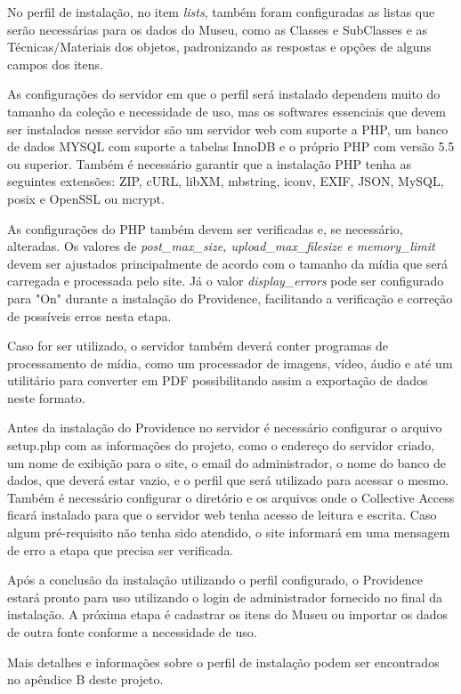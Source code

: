 \documentclass[a4paper,12pt,oneside,onecolumn,final,fleqn]{repUERJ}
\begin{document}
No perfil de instalação, no item \textit{lists}, também foram configuradas as listas que serão necessárias para os dados do Museu, como as Classes e SubClasses e as Técnicas/Materiais dos objetos, padronizando as respostas e opções de alguns campos dos itens.

As configurações do servidor em que o perfil será instalado dependem muito do tamanho da coleção e necessidade de uso, mas os softwares essenciais que devem ser instalados nesse servidor são um servidor web com suporte a PHP, um banco de dados MYSQL com suporte a tabelas InnoDB e o próprio PHP com versão 5.5 ou superior. Também é necessário garantir que a instalação PHP tenha as seguintes extensões: ZIP, cURL, libXM, mbstring, iconv, EXIF, JSON, MySQL, posix e OpenSSL ou mcrypt.

As configurações do PHP também devem ser verificadas e, se necessário, alteradas. Os valores de \textit{post\_max\_size, upload\_max\_filesize e memory\_limit} devem ser ajustados principalmente de acordo com o tamanho da mídia que será carregada e processada pelo site. Já o valor \textit{display\_errors} pode ser configurado para "On" durante a instalação do Providence, facilitando a verificação e correção de possíveis erros nesta etapa.

Caso for ser utilizado, o servidor também deverá conter programas de processamento de mídia, como um processador de imagens, vídeo, áudio e até um utilitário para converter em PDF possibilitando assim a exportação de dados neste formato.

Antes da instalação do Providence no servidor é necessário configurar o arquivo setup.php com as informações do projeto, como o endereço do servidor criado, um nome de exibição para o site, o email do administrador, o nome do banco de dados, que deverá estar vazio, e o perfil que será utilizado para acessar o mesmo. Também é necessário configurar o diretório e os arquivos onde o Collective Access ficará instalado para que o servidor web tenha acesso de leitura e escrita. Caso algum pré-requisito não tenha sido atendido, o site informará em uma mensagem de erro a etapa que precisa ser verificada.

Após a conclusão da instalação utilizando o perfil configurado, o Providence estará pronto para uso utilizando o login de administrador fornecido no final da instalação. A próxima etapa é cadastrar os itens do Museu ou importar os dados de outra fonte conforme a necessidade de uso.

Mais detalhes e informações sobre o perfil de instalação podem ser encontrados no apêndice B deste projeto.
\end{document}
